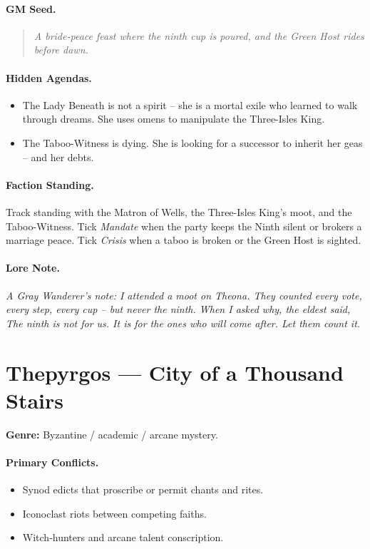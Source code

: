 \paragraph{GM Seed.}
\begin{quote}
\emph{A bride-peace feast where the ninth cup is poured, and the Green Host rides before dawn.}
\end{quote}

\paragraph{Hidden Agendas.}
\begin{itemize}
  \item The Lady Beneath is not a spirit -- she is a mortal exile who learned to walk through dreams. She uses omens to manipulate the Three-Isles King.
  \item The Taboo-Witness is dying. She is looking for a successor to inherit her geas -- and her debts.
\end{itemize}

\paragraph{Faction Standing.}
Track standing with the Matron of Wells, the Three-Isles King's moot, and the Taboo-Witness. Tick \textit{Mandate} when the party keeps the Ninth silent or brokers a marriage peace. Tick \textit{Crisis} when a taboo is broken or the Green Host is sighted.

\paragraph{Lore Note.}
\emph{A Gray Wanderer's note: \textquotedbl I attended a moot on Theona. They counted every vote, every step, every cup -- but never the ninth. When I asked why, the eldest said, \textquotedbl The ninth is not for us. It is for the ones who will come after. Let them count it.\textquotedbl}

\section{Thepyrgos --- \textquotedbl City of a Thousand Stairs\textquotedbl}
\textbf{Genre:} Byzantine / academic / arcane mystery.

\paragraph{Primary Conflicts.}
\begin{itemize}
  \item Synod edicts that proscribe or permit chants and rites.
  \item Iconoclast riots between competing faiths.
  \item Witch-hunters and arcane talent conscription.
\end{itemize}

